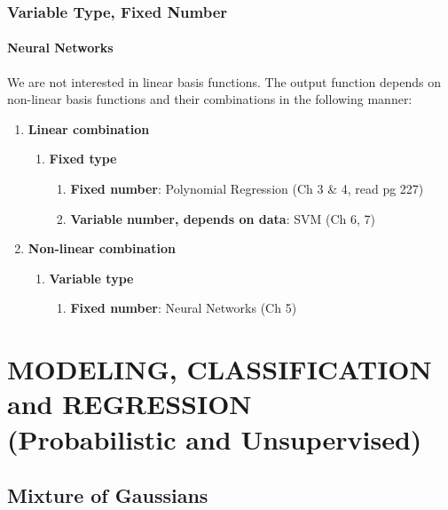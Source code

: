\documentclass{book}
\begin{document}
\section{Variable Type, Fixed Number} 
\subsection{Neural Networks}

We are not interested in linear basis functions.
The output function depends on non-linear basis functions and their combinations in the following manner:

\begin{enumerate}
\item {\color{red}\textbf{Linear combination}}
\begin{enumerate}
\item {\color{OliveGreen}\textbf{Fixed type}}
\begin{enumerate}
\item {\color{blue}\textbf{Fixed number}}: Polynomial Regression (Ch 3 \& 4, read pg 227) 
\item {\color{blue}\textbf{Variable number, depends on data}}: SVM (Ch 6, 7)
\end{enumerate}
\end{enumerate}
\item {\color{red}\textbf{Non-linear combination}}
\begin{enumerate}
\item {\color{OliveGreen}\textbf{Variable type}}
\begin{enumerate}
\item {\color{blue}\textbf{Fixed number}}: Neural Networks (Ch 5)
\end{enumerate}
\end{enumerate}
\end{enumerate}




\part{MODELING, CLASSIFICATION and REGRESSION\\(Probabilistic and Unsupervised)}
\chapter{Mixture of Gaussians}
\end{document}
